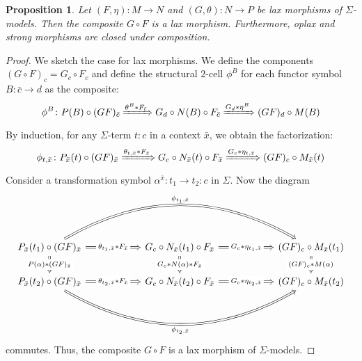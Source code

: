 \documentclass[11pt]{article}
\theoremstyle{plain}
\newtheorem{proposition}[theorem]{Proposition}
\theoremstyle{definition}
\numberwithin{equation}{section}
\begin{document}
\begin{proposition}
   Let $(F,\eta) \colon M \to N$ and $(G,\theta) \colon N \to P$ be lax morphisms of $\Sigma$-models. Then the composite $G \circ F$ is a lax morphism. Furthermore, oplax and strong morphisms are closed under composition.
\end{proposition}
\begin{proof}
   We sketch the case for lax morphisms. We define the components $(G \circ F)_c = G_c \circ F_c$ and define the structural $2$-cell $\phi^B$ for each functor symbol $B \colon \bar{c} \to d$ as the composite:
   $$
   \phi^B \colon P(B) \circ (GF)_{\bar{c}} \xRightarrow{\theta^B*F_{\bar{c}}} G_d \circ N(B) \circ F_{\bar{c}} \xRightarrow{G_d * \eta^B} (GF)_d \circ M(B)
   $$
   By induction, for any $\Sigma$-term $t \colon c$ in a context $\bar{x}$, we obtain the factorization:
   $$
   \phi_{t, \bar{x}} \colon P_{\bar{x}}(t) \circ (GF)_{\bar{x}} \xRightarrow{\theta_{t, \bar{x}}*F_{\bar{x}}} G_c \circ N_{\bar{x}}(t) \circ F_{\bar{x}} \xRightarrow{G_c*\eta_{t, \bar{x}}} (GF)_c \circ M_{\bar{x}}(t)
   $$
   Consider a transformation symbol $\alpha^{\bar{x}} \colon t_1 \to t_2\colon c$ in $\Sigma$. Now the diagram
   $$
   \begin{tikzcd}[column sep = 2cm, ampersand replacement=\&]
   P_{\bar{x}}(t_1) \circ (GF)_{\bar{x}} \arrow[d, "P(\alpha)*(GF)_{\bar{x}}" description, Rightarrow] \arrow[rr, "\phi_{t_1, \bar{x}}", Rightarrow, bend left] \arrow[r, "\theta_{t_1, \bar{x}}*F_{\bar{x}}" description, Rightarrow] \& G_c \circ N_{\bar{x}}(t_1) \circ F_{\bar{x}} \arrow[r, "G_c*\eta_{t_1, \bar{x}}" description, Rightarrow] \arrow[d, "G_c*N(\alpha)*F_{\bar{x}}" description, Rightarrow] \& (GF)_c \circ M_{\bar{x}}(t_1) \arrow[d, "(GF)_c*M(\alpha)" description, Rightarrow] \\
   P_{\bar{x}}(t_2) \circ (GF)_{\bar{x}} \arrow[r, "\theta_{t_2, \bar{x}}*F_{\bar{x}}"' description, Rightarrow] \arrow[rr, "\phi_{t_2, \bar{x}}"', Rightarrow, bend right]                                        \& G_c \circ N_{\bar{x}}(t_2) \circ F_{\bar{x}} \arrow[r, "G_c*\eta_{t_2, \bar{x}}"' description, Rightarrow]                                                                \& (GF)_c \circ M_{\bar{x}}(t_2)
   \end{tikzcd}
   $$
   commutes. Thus, the composite $G \circ F$ is a lax morphism of $\Sigma$-models.
\end{proof}
\end{document}
